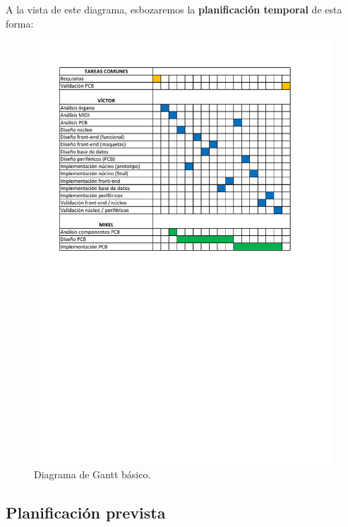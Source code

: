 \newpage

A la vista de este diagrama, esbozaremos la \textbf{planificación temporal} de esta forma:

\smallskip

\begin{figure}[H]
	\noindent \begin{centering}
		\includegraphics[width=\linewidth]{capitulo2/plan_gantt}
		\par\end{centering}
	\smallskip
	\caption{\label{fig:plan_gantt} Diagrama de Gantt básico.}
\end{figure} 

\smallskip

\subsection{Planificación prevista}

